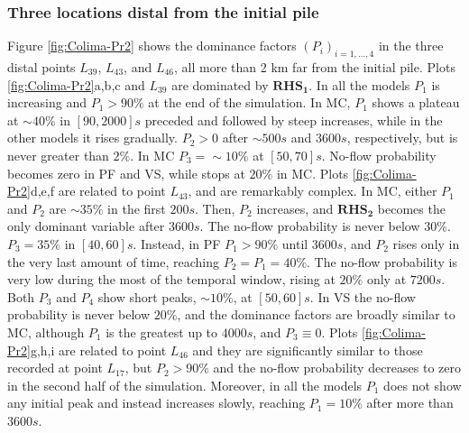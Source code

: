 \documentclass{article}
\begin{document}
\subsubsection{Three locations distal from the initial pile}
Figure \ref{fig:Colima-Pr2} shows the dominance factors $(P_i)_{i=1,\dots,4}$ in the three distal points $L_{39}$, $L_{43}$, and $L_{46}$, all more than 2 km far from the initial pile. Plots \ref{fig:Colima-Pr2}a,b,c and $L_{39}$ are dominated by $\boldsymbol{RHS_1}$. In all the models $P_1$ is increasing and $P_1>90\%$ at the end of the simulation. In MC, $P_1$ shows a plateau at $\sim 40\%$ in $[90,2000] s$ preceded and followed by steep increases, while in the other models it rises gradually. $P_2>0$ after $\sim 500 s$ and $3600 s$, respectively, but is never greater than $2\%$. In MC $P_3=\sim 10\%$ at $[50,70] s$. No-flow probability becomes zero in PF and VS, while stops at $20\%$ in MC. Plots \ref{fig:Colima-Pr2}d,e,f are related to point $L_{43}$, and are remarkably complex. In MC, either $P_1$ and $P_2$ are $\sim 35\%$ in the first $200 s$. Then, $P_2$ increases, and $\boldsymbol{RHS_2}$ becomes the only dominant variable after $3600 s$. The no-flow probability is never below $30\%$. $P_3=35\%$ in $[40, 60] s$. Instead, in PF $P_1>90\%$ until $3600 s$, and $P_2$ rises only in the very last amount of time, reaching $P_2=P_1=40\%$. The no-flow probability is very low during the most of the temporal window, rising at $20\%$ only at $7200 s$. Both $P_3$ and $P_4$ show short peaks, $\sim 10\%$, at $[50,60] s$. In VS the no-flow probability is never below $20\%$, and the dominance factors are broadly similar to MC, although $P_1$ is the greatest up to $4000 s$, and $P_3\equiv0$. Plots \ref{fig:Colima-Pr2}g,h,i are related to point $L_{46}$ and they are significantly similar to those recorded at point $L_{17}$, but $P_2>90\%$ and the no-flow probability decreases to zero in the second half of the simulation. Moreover, in all the models $P_1$ does not show any initial peak and instead increases slowly, reaching $P_1=10\%$ after more than $3600 s$.
\end{document}
